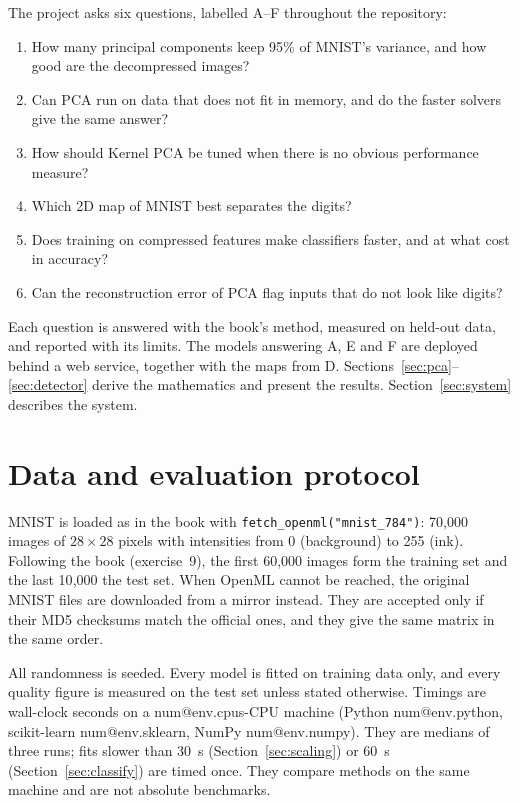 \documentclass[11pt,a4paper]{article}
\makeatletter
\newcommand{\R}[1]{\csname num@#1\endcsname}
\makeatother
\begin{document}
The project asks six questions, labelled A--F throughout the repository:
\begin{enumerate}[label=\Alph*.]
\item How many principal components keep 95\% of MNIST's variance, and how good are the decompressed images?
\item Can PCA run on data that does not fit in memory, and do the faster solvers give the same answer?
\item How should Kernel PCA be tuned when there is no obvious performance measure?
\item Which 2D map of MNIST best separates the digits?
\item Does training on compressed features make classifiers faster, and at what cost in accuracy?
\item Can the reconstruction error of PCA flag inputs that do not look like digits?
\end{enumerate}
Each question is answered with the book's method, measured on held-out data, and reported with its limits. The models answering A, E and F are deployed behind a web service, together with the maps from D. Sections~\ref{sec:pca}--\ref{sec:detector} derive the mathematics and present the results. Section~\ref{sec:system} describes the system.

\section{Data and evaluation protocol}\label{sec:data}

MNIST is loaded as in the book with \texttt{fetch\_openml("mnist\_784")}: 70{,}000 images of $28\times 28$ pixels with intensities from 0 (background) to 255 (ink). Following the book (exercise~9), the first 60{,}000 images form the training set and the last 10{,}000 the test set. When OpenML cannot be reached, the original MNIST files are downloaded from a mirror instead. They are accepted only if their MD5 checksums match the official ones, and they give the same matrix in the same order.

All randomness is seeded. Every model is fitted on training data only, and every quality figure is measured on the test set unless stated otherwise. Timings are wall-clock seconds on a \R{env.cpus}-CPU machine (Python \R{env.python}, scikit-learn \R{env.sklearn}, NumPy \R{env.numpy}). They are medians of three runs; fits slower than 30~s (Section~\ref{sec:scaling}) or 60~s (Section~\ref{sec:classify}) are timed once. They compare methods on the same machine and are not absolute benchmarks.
\end{document}
